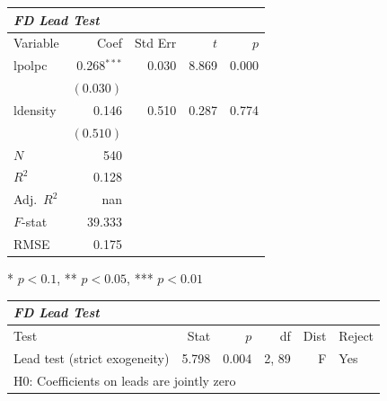 \documentclass{article}
\begin{document}
\renewcommand{\arraystretch}{1.1}
\setlength{\tabcolsep}{6pt}
\begin{tabular}{lrrrr}
\hline
\multicolumn{5}{l}{\textit{FD Lead Test}} \\
\hline
Variable & Coef & Std Err & $t$ & $p$ \\
\hline
lpolpc & 0.268$^{\ast\ast\ast}$ & 0.030 & 8.869 & 0.000 \\
 & $(0.030)$ & & & \\
ldensity & 0.146 & 0.510 & 0.287 & 0.774 \\
 & $(0.510)$ & & & \\
\hline
$N$ & 540 & & & \\
$R^2$ & 0.128 & & & \\
Adj.\ $R^2$ & nan & & & \\
$F$-stat & 39.333 & & & \\
RMSE & 0.175 & & & \\
\hline
\end{tabular}
\vspace{2pt}
\begin{flushleft}\footnotesize{* $p<0.1$, ** $p<0.05$, *** $p<0.01$}\end{flushleft}

\renewcommand{\arraystretch}{1.1}
\setlength{\tabcolsep}{6pt}
\begin{tabular}{lrrrrl}
\hline
\multicolumn{6}{l}{\textit{FD Lead Test}} \\
\hline
Test & Stat & $p$ & df & Dist & Reject \\
\hline
Lead test (strict exogeneity) & 5.798 & 0.004 & 2, 89 & F & Yes \\
\multicolumn{6}{l}{\footnotesize{H0: Coefficients on leads are jointly zero}} \\
\hline
\end{tabular}
\end{document}

